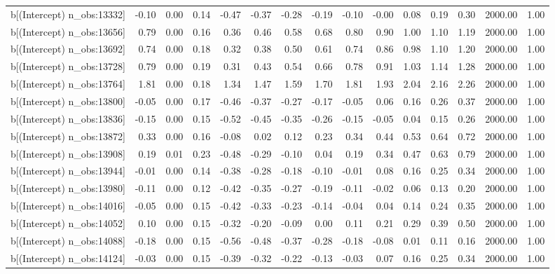 \begin{table}[ht]
\begin{tabular}{rrrrrrrrrrrrrrr}
  b[(Intercept) n\_obs:13332] & -0.10 & 0.00 & 0.14 & -0.47 & -0.37 & -0.28 & -0.19 & -0.10 & -0.00 & 0.08 & 0.19 & 0.30 & 2000.00 & 1.00 \\ 
  b[(Intercept) n\_obs:13656] & 0.79 & 0.00 & 0.16 & 0.36 & 0.46 & 0.58 & 0.68 & 0.80 & 0.90 & 1.00 & 1.10 & 1.19 & 2000.00 & 1.00 \\ 
  b[(Intercept) n\_obs:13692] & 0.74 & 0.00 & 0.18 & 0.32 & 0.38 & 0.50 & 0.61 & 0.74 & 0.86 & 0.98 & 1.10 & 1.20 & 2000.00 & 1.00 \\ 
  b[(Intercept) n\_obs:13728] & 0.79 & 0.00 & 0.19 & 0.31 & 0.43 & 0.54 & 0.66 & 0.78 & 0.91 & 1.03 & 1.14 & 1.28 & 2000.00 & 1.00 \\ 
  b[(Intercept) n\_obs:13764] & 1.81 & 0.00 & 0.18 & 1.34 & 1.47 & 1.59 & 1.70 & 1.81 & 1.93 & 2.04 & 2.16 & 2.26 & 2000.00 & 1.00 \\ 
  b[(Intercept) n\_obs:13800] & -0.05 & 0.00 & 0.17 & -0.46 & -0.37 & -0.27 & -0.17 & -0.05 & 0.06 & 0.16 & 0.26 & 0.37 & 2000.00 & 1.00 \\ 
  b[(Intercept) n\_obs:13836] & -0.15 & 0.00 & 0.15 & -0.52 & -0.45 & -0.35 & -0.26 & -0.15 & -0.05 & 0.04 & 0.15 & 0.26 & 2000.00 & 1.00 \\ 
  b[(Intercept) n\_obs:13872] & 0.33 & 0.00 & 0.16 & -0.08 & 0.02 & 0.12 & 0.23 & 0.34 & 0.44 & 0.53 & 0.64 & 0.72 & 2000.00 & 1.00 \\ 
  b[(Intercept) n\_obs:13908] & 0.19 & 0.01 & 0.23 & -0.48 & -0.29 & -0.10 & 0.04 & 0.19 & 0.34 & 0.47 & 0.63 & 0.79 & 2000.00 & 1.00 \\ 
  b[(Intercept) n\_obs:13944] & -0.01 & 0.00 & 0.14 & -0.38 & -0.28 & -0.18 & -0.10 & -0.01 & 0.08 & 0.16 & 0.25 & 0.34 & 2000.00 & 1.00 \\ 
  b[(Intercept) n\_obs:13980] & -0.11 & 0.00 & 0.12 & -0.42 & -0.35 & -0.27 & -0.19 & -0.11 & -0.02 & 0.06 & 0.13 & 0.20 & 2000.00 & 1.00 \\ 
  b[(Intercept) n\_obs:14016] & -0.05 & 0.00 & 0.15 & -0.42 & -0.33 & -0.23 & -0.14 & -0.04 & 0.04 & 0.14 & 0.24 & 0.35 & 2000.00 & 1.00 \\ 
  b[(Intercept) n\_obs:14052] & 0.10 & 0.00 & 0.15 & -0.32 & -0.20 & -0.09 & 0.00 & 0.11 & 0.21 & 0.29 & 0.39 & 0.50 & 2000.00 & 1.00 \\ 
  b[(Intercept) n\_obs:14088] & -0.18 & 0.00 & 0.15 & -0.56 & -0.48 & -0.37 & -0.28 & -0.18 & -0.08 & 0.01 & 0.11 & 0.16 & 2000.00 & 1.00 \\ 
  b[(Intercept) n\_obs:14124] & -0.03 & 0.00 & 0.15 & -0.39 & -0.32 & -0.22 & -0.13 & -0.03 & 0.07 & 0.16 & 0.25 & 0.34 & 2000.00 & 1.00 \\ 

\end{tabular}
\end{table}
